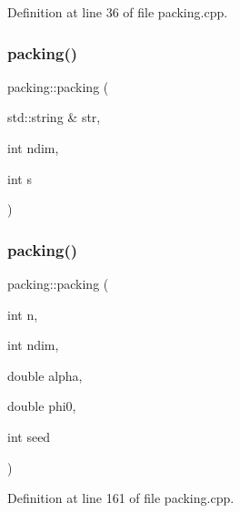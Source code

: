 Definition at line 36 of file packing.\+cpp.

\mbox{\label{classpacking_ac345d2c7345a103d7b390585565d2712}} 
\subsubsection{\texorpdfstring{packing()}{packing()}\hspace{0.1cm}{\footnotesize\ttfamily [2/4]}}
{\footnotesize\ttfamily packing\+::packing (\begin{DoxyParamCaption}\item[{std\+::string \&}]{str,  }\item[{int}]{ndim,  }\item[{int}]{s }\end{DoxyParamCaption})}

\mbox{\label{classpacking_a954ef88de3bcf03906e7b9c1511c4338}} 
\subsubsection{\texorpdfstring{packing()}{packing()}\hspace{0.1cm}{\footnotesize\ttfamily [3/4]}}
{\footnotesize\ttfamily packing\+::packing (\begin{DoxyParamCaption}\item[{int}]{n,  }\item[{int}]{ndim,  }\item[{double}]{alpha,  }\item[{double}]{phi0,  }\item[{int}]{seed }\end{DoxyParamCaption})}



Definition at line 161 of file packing.\+cpp.

\mbox{\label{classpacking_ae34dd16515628814825132a9dbf06543}} 
